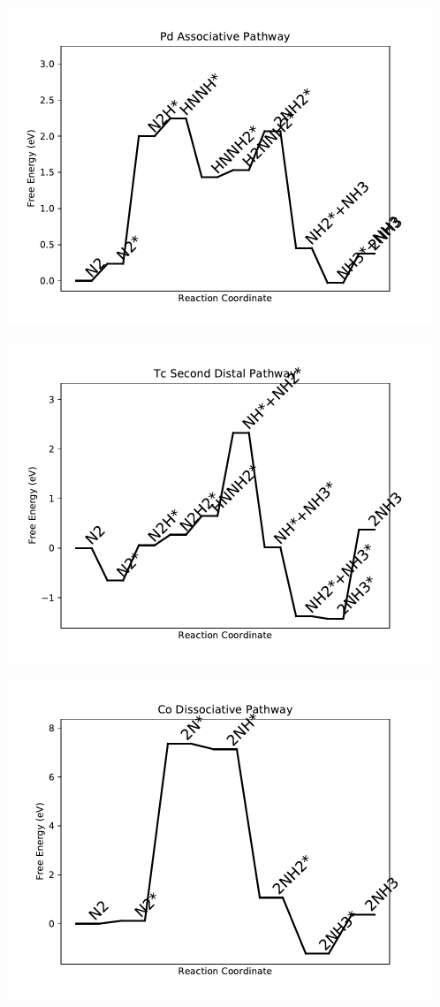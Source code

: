 \begin{figure}
\centering
\includegraphics[width=0.8\linewidth]{data/plots/Pd_associative.pdf}
\end{figure}

\begin{figure}
\centering
\includegraphics[width=0.8\linewidth]{data/plots/Tc_distal_2.pdf}
\end{figure}

\begin{figure}
\centering
\includegraphics[width=0.8\linewidth]{data/plots/Co_dissociative.pdf}
\end{figure}

